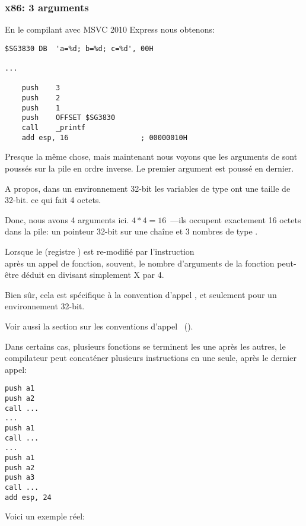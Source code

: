 \subsubsection{x86: 3 arguments}


En le compilant avec MSVC 2010 Express nous obtenons:

\begin{lstlisting}[style=customasmx86]
$SG3830	DB	'a=%d; b=%d; c=%d', 00H

...

	push	3
	push	2
	push	1
	push	OFFSET $SG3830
	call	_printf
	add	esp, 16					; 00000010H
\end{lstlisting}

Presque la même chose, mais maintenant nous voyons que les arguments de \printf sont
poussés sur la pile en ordre inverse. Le premier argument est poussé en dernier.

A propos, dans un environnement 32-bit les variables de type \Tint ont une taille
de 32-bit. ce qui fait 4 octets.

Donc, nous avons 4 arguments ici. $4*4 = 16$~---ils occupent exactement 16 octets
dans la pile: un pointeur 32-bit sur une chaîne et 3 nombres de type \Tint.

Lorsque le  (registre \ESP) est re-modifié
par l'instruction\\  après un appel de fonction, souvent, le nombre
d'arguments de la fonction peut-être déduit en divisant simplement X par 4.

Bien sûr, cela est spécifique à la convention d'appel , et seulement
pour un environnement 32-bit.

Voir aussi la section sur les conventions d'appel ~().

Dans certains cas, plusieurs fonctions se terminent les une après les autres, le
compilateur peut concaténer plusieurs instructions  en une seule,
après le dernier appel:

\begin{lstlisting}[style=customasmx86]
push a1
push a2
call ...
...
push a1
call ...
...
push a1
push a2
push a3
call ...
add esp, 24
\end{lstlisting}

Voici un exemple réel:



